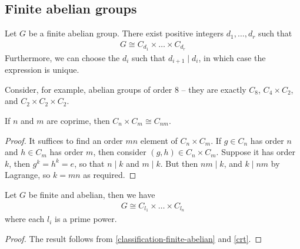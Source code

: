 \documentclass{../../template/note}
\begin{document}
    \subsection{Finite abelian groups}

    \begin{theorem}
        \label{classification-finite-abelian}
        Let $G$ be a finite abelian group. There exist positive integers $d_1, \dots, d_r$ such that
        \begin{align*}
            G \cong C_{d_1} \times \dots \times C_{d_r}
        \end{align*}
        Furthermore, we can choose the $d_i$ such that $d_{i+1} \mid d_i$, in which case the expression is unique.
    \end{theorem}
    
    \begin{example}
        Consider, for example, abelian groups of order 8 -- they are exactly $C_8$, $C_4 \times C_2$, and $C_2 \times C_2 \times C_2$.
    \end{example}
    
    \begin{lemma}
        \label{crt}
        If $n$ and $m$ are coprime, then $C_n \times C_m \cong C_{nm}$.
    \end{lemma}
    
    \begin{proof}
        It suffices to find an order $mn$ element of $C_n \times C_m$. If $g \in C_n$ has order $n$ and $h \in C_m$ has order $m$, then consider $(g, h) \in C_n \times C_m$. Suppose it has order $k$, then $g^k = h^k = e$, so that $n \mid k$ and $m \mid k$. But then $nm \mid k$, and $k \mid nm$ by Lagrange, so $k=mn$ as required.
    \end{proof}
    

    \begin{corollary}
        Let $G$ be finite and abelian, then we have
        \begin{align*}
            G \cong C_{l_1} \times \dots \times C_{l_n}
        \end{align*}
        where each $l_i$ is a prime power.        
    \end{corollary}
    
    \begin{proof}
        The result follows from \cref{classification-finite-abelian} and \cref{crt}.
    \end{proof}
    
\end{document}
